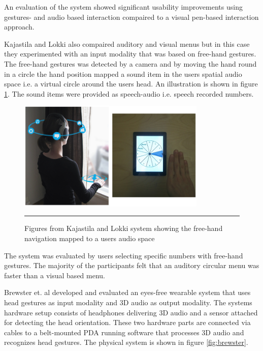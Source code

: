 An evaluation of the system showed significant usability improvements using gestures- and audio based interaction compaired to a visual pen-based interaction approach.


Kajastila and Lokki \cite{kajastila_interaction_2013} also compaired auditory and visual menus but in this case they experimented with an input modality that was based on free-hand gestures. The free-hand gestures was detected by a camera and by moving the hand round in a circle the hand position mapped a sound item in the users spatial audio space i.e. a virtual circle around the users head. An illustration is shown in figure \ref{fig:kajastila}. The sound items were provided as speech-audio i.e. speech recorded numbers.

\begin{figure}[t]
	\centering
		\includegraphics[width=0.8\textwidth,height=\textheight,keepaspectratio]{./Figures/kajastila-system.png}
		\rule{35em}{0.5pt}
	\caption[Kajastila system]{Figures from Kajastila and Lokki \cite{kajastila_interaction_2013} system showing the free-hand navigation mapped to a users audio space}
	\label{fig:kajastila}
\end{figure}

The system was evaluated by users selecting specific numbers with free-hand gestures. The majority of the participants felt that an auditory circular menu was faster than a visual based menu.


Brewster et. al \cite{brewster_multimodaleyes-freeinteraction_2003} developed and evaluated an eyes-free wearable system that uses head gestures as input modality and 3D audio as output modality. The systems hardware setup consists of headphones delivering 3D audio and a sensor attached for detecting the head orientation. These two hardware parts are connected via cables to a belt-mounted PDA running software that processes 3D audio and recognizes head gestures. The physical system is shown in figure \ref{fig:brewster}.

